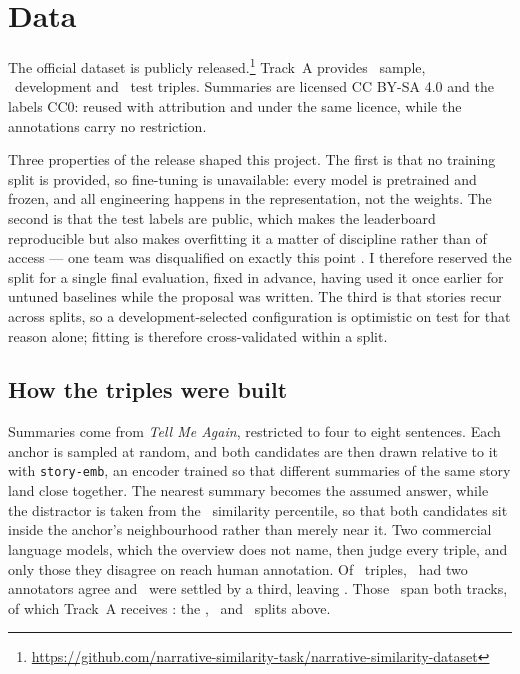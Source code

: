 \documentclass[11pt,letterpaper,twocolumn]{article}
\begin{document}
\section{Data}\label{sec:data}
The official dataset is publicly
released.\footnote{\raggedright\url{https://github.com/narrative-similarity-task/narrative-similarity-dataset}}
Track~A provides \SampleN\ sample, \DevN\ development and \TestN\ test triples.
Summaries are licensed CC BY-SA 4.0 and the labels CC0:  %
reused with attribution and under the same licence, while the annotations carry
no restriction.

Three properties of the release shaped this project. The first is that no training
split is provided, so fine-tuning is unavailable: every model is pretrained and
frozen, and all engineering happens in the representation, not the weights. The second is that the test labels
are public, which makes the leaderboard reproducible but also makes
overfitting it a matter of discipline rather than of access --- one team was
disqualified on exactly this point \citep{hatzel2026}. I therefore reserved the
split for a single final evaluation, fixed in advance, having used it once
earlier for untuned baselines while the proposal was written. The third is that stories
recur across splits, so a development-selected configuration is optimistic on
test for that reason alone; fitting is therefore cross-validated within a
split.

\subsection{How the triples were built}


Summaries come from \emph{Tell Me Again}, restricted to four to eight
sentences. Each anchor is sampled at random, and both candidates are then drawn
relative to it with \texttt{story-emb}, an encoder trained so that different
summaries of the same story land close together. The nearest summary becomes
the assumed answer, while the distractor is taken from the
\DistractorPercentile\ similarity percentile, so that both candidates sit inside
the anchor's neighbourhood rather than merely near it. Two commercial language
models, which the overview does not name, then judge every triple, and only
those they disagree on reach human annotation. Of \AnnotTotal\ triples,
\AnnotAgreed\ had two annotators agree and \AnnotAdjudicated\ were settled by a
third, leaving \AnnotKept. Those \AnnotKept\ span both tracks, of which Track~A
receives \TrackAKept: the \SampleN, \DevN\ and \TestN\ splits above.
\end{document}
